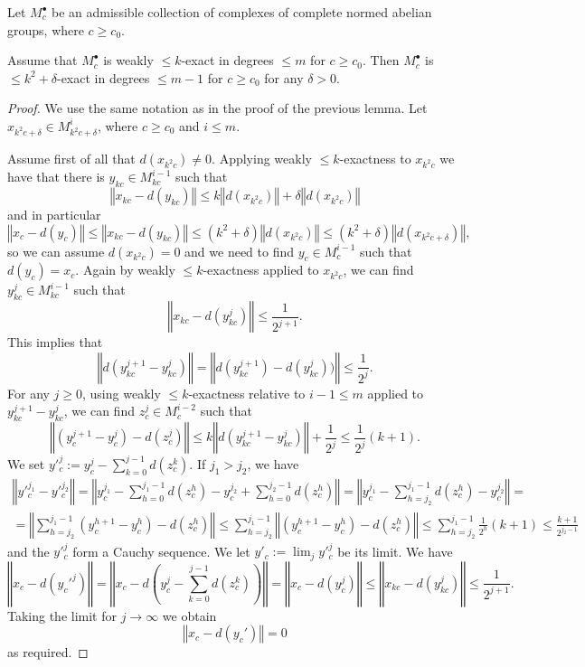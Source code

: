 \begin{lemma}
  \label{weakexact_implies_exact}
  Let $M^\bullet_c$ be an admissible collection
  of complexes of complete normed abelian groups, where $c\geq c_0$.

  Assume that $M^\bullet_c$ is weakly $\leq k$-exact in degrees $\leq m$ for $c\geq c_0$.
  Then $M^\bullet_c$ is $\leq k^2 + \delta$-exact in degrees $\leq m-1$ for $c\geq c_0$ for any $\delta > 0$.
\end{lemma}
\begin{proof}
We use the same notation as in the proof of the previous lemma. Let $x_{k^2c + \delta} \in M^i_{k^2c + \delta}$, where $c \geq c_0$ and $i \leq m$.

Assume first of all that $d(x_{k^2c}) \neq 0$. Applying weakly $\leq k$-exactness to $x_{k^2c}$ we have that there is $y_{kc} \in M^{i-1}_{kc}$ such that
\[
‖ x_{kc} - d(y_{kc}) ‖ \leq k‖d(x_{k^2c})‖ + \delta ‖d(x_{k^2c})‖
\]
and in particular
\[
‖ x_c - d(y_c) ‖ \leq ‖ x_{kc} - d(y_{kc}) ‖ \leq (k^2 + \delta)‖d(x_{k^2c})‖ \leq (k^2 + \delta)‖d(x_{k^2c + \delta})‖,
\]
so we can assume $d(x_{k^2c}) = 0$ and we need to find $y_c \in M^{i-1}_c$ such that $d(y_c) = x_c$. Again by weakly $\leq k$-exactness applied to $x_{k^2c}$, we can find $y_{kc}^j \in M^{i-1}_{kc}$ such that
\[
‖ x_{kc} - d(y_{kc}^j) ‖ \leq \frac{1}{2^{j+1}}.
\]
This implies that
\[
‖d(y_{kc}^{j+1} - y_{kc}^j)‖ = ‖d(y_{kc}^{j+1}) - d(y_{kc}^j))‖ \leq \frac{1}{2^j}.
\]
For any $j \geq 0$, using weakly $\leq k$-exactness relative to $i-1 \leq m$ applied to $y_{kc}^{j+1} - y_{kc}^j$, we can find $z^j_c \in M^{i-2}_c$ such that
\[
‖(y_c^{j+1} - y_c^j) - d(z^j_c)‖ \leq k‖d(y_{kc}^{j+1} - y_{kc}^j)‖ + \frac{1}{2^j} \leq \frac{1}{2^j}(k+1).
\]
We set $y'^j_c := y_c^j - \sum_{k=0}^{j-1} d(z_c^k)$. If $j_1 > j_2$, we have
\[ \begin{aligned}
‖y'^{j_1}_c - y'^{j_2}_c‖ = ‖ y_c^{j_1} - \sum_{h=0}^{j_1-1} d(z_c^h) - y_c^{j_2} + \sum_{h=0}^{j_2-1} d(z_c^h) ‖ = ‖ y_c^{j_1} - \sum_{h=j_2}^{j_1-1} d(z_c^h) - y_c^{j_2} ‖ = \\
= ‖ \sum_{h = j_2}^{j_1 - 1} (y_c^{h+1} - y_c^h) - d(z_c^h) ‖ \leq \sum_{h = j_2}^{j_1 - 1} ‖ (y_c^{h+1} - y_c^h) - d(z_c^h) ‖ \leq \sum_{h = j_2}^{j_1 - 1} \frac{1}{2^h}(k+1) \leq \frac{k+1}{2^{j_2 - 1}}
\end{aligned}\]
and the $y'^j_c$ form a Cauchy sequence. We let $y'_c := \lim_j y'^j_c$ be its limit. We have
\[
‖ x_c - d(y_c'^j) ‖ = ‖ x_c - d(y_c^j - \sum_{k=0}^{j-1} d(z_c^k)) ‖ = ‖ x_c - d(y_c^j) ‖ \leq ‖ x_{kc} - d(y_{kc}^j) ‖ \leq \frac{1}{2^{j+1}}.
\]
Taking the limit for $j \to \infty$ we obtain
\[
 ‖ x_c - d(y_c') ‖ = 0
\]
as required.
\end{proof}

